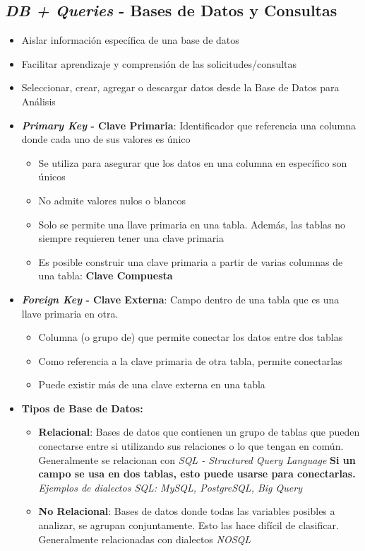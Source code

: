 \subsection{\textit{DB + Queries} - Bases de Datos y Consultas}
\begin{itemize}
    \item {Aislar información específica de una base de datos}
    \item {Facilitar aprendizaje y comprensión de las solicitudes/consultas}
    \item {Seleccionar, crear, agregar o descargar datos desde la Base de Datos para Análisis}
    \item {\textbf{\textit{Primary Key} - Clave Primaria}: Identificador que referencia una columna donde cada uno de sus valores es único
    \begin{itemize}
        \item {Se utiliza para asegurar que los datos en una columna en específico son únicos}
        \item {No admite valores nulos o blancos}
        \item {Solo se permite una llave primaria en una tabla. Además, las tablas no siempre requieren tener una clave primaria}
        \item {Es posible construir una clave primaria a partir de varias columnas de una tabla: \textbf{Clave Compuesta}}
    \end{itemize}}
    \item {\textbf{\textit{Foreign Key} - Clave Externa}: Campo dentro de una tabla que es una llave primaria en otra.
    \begin{itemize}
        \item {Columna (o grupo de) que permite conectar los datos entre dos tablas}
        \item {Como referencia a la clave primaria de otra tabla, permite conectarlas}
        \item {Puede existir más de una clave externa en una tabla}
    \end{itemize}}
    \item {\textbf{Tipos de Base de Datos: }
    \begin{itemize}
        \item {\textbf{Relacional}: Bases de datos que contienen un grupo de tablas que pueden conectarse entre si utilizando sus relaciones o lo que tengan en común. Generalmente se relacionan con \textit{SQL - Structured Query Language} \textbf{Si un campo se usa en dos tablas, esto puede usarse para conectarlas.} \textit{Ejemplos de dialectos SQL: MySQL, PostgreSQL, Big Query}}
        \item {\textbf{No Relacional}: Bases de datos donde todas las variables posibles a analizar, se agrupan conjuntamente. Esto las hace difícil de clasificar. Generalmente relacionadas con dialectos \textit{NOSQL}}
    \end{itemize}}
\end{itemize}


